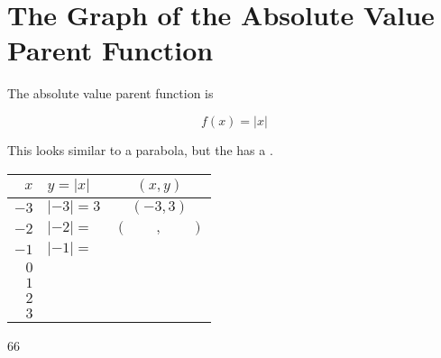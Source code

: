 \section{The Graph of the Absolute Value Parent Function}

The absolute value parent function is 
\begin{tcolorbox}[center,width=1.75in,valign=center,]
    \large
    \vspace{-1.2em}
    \[ f(x) = |x| \]
\end{tcolorbox}
%
This looks similar to a parabola, but the  has a  .

\begin{minipage}{0.5\textwidth}
    \centering 
    \small
    \renewcommand{\arraystretch}{1.75}
    \begin{tabular}{r|p{1.25in}|c}
        $x$ 
            & $y = |x|$    
            & $(x,y)$\\ \hline\hline
        $-3$ 
            & $|-3| = 3$  
            & $(-3,3)$\\ \hline
        $-2$ 
            & $|-2| = $ 
            & $(\phantom{9999},\phantom{9999})$\\ \hline
        $-1$ 
            & $|-1| = $  
            & \\ \hline
        $0$ 
            &  
            & \\ \hline
        $1$ 
            &   
            & \\ \hline
        $2$ 
            &     
            & \\ \hline
        $3$ 
            &    
            & \\ \hline
    \end{tabular}
\end{minipage}
\begin{minipage}{0.5\textwidth}
    \centering
    \begin{myTikzpictureGrid}{0.4} {6}{6}
    \end{myTikzpictureGrid}
\end{minipage}